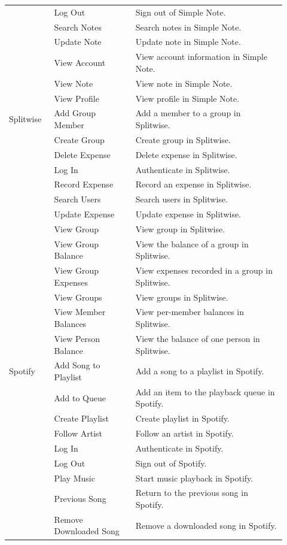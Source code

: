 \begin{longtable}{@{}p{0.15\linewidth}p{0.27\linewidth}p{0.50\linewidth}@{}}
 & Log Out & Sign out of Simple Note. \\
 & Search Notes & Search notes in Simple Note. \\
 & Update Note & Update note in Simple Note. \\
 & View Account & View account information in Simple Note. \\
 & View Note & View note in Simple Note. \\
 & View Profile & View profile in Simple Note. \\
\midrule
Splitwise & Add Group Member & Add a member to a group in Splitwise. \\
 & Create Group & Create group in Splitwise. \\
 & Delete Expense & Delete expense in Splitwise. \\
 & Log In & Authenticate in Splitwise. \\
 & Record Expense & Record an expense in Splitwise. \\
 & Search Users & Search users in Splitwise. \\
 & Update Expense & Update expense in Splitwise. \\
 & View Group & View group in Splitwise. \\
 & View Group Balance & View the balance of a group in Splitwise. \\
 & View Group Expenses & View expenses recorded in a group in Splitwise. \\
 & View Groups & View groups in Splitwise. \\
 & View Member Balances & View per-member balances in Splitwise. \\
 & View Person Balance & View the balance of one person in Splitwise. \\
\midrule
Spotify & Add Song to Playlist & Add a song to a playlist in Spotify. \\
 & Add to Queue & Add an item to the playback queue in Spotify. \\
 & Create Playlist & Create playlist in Spotify. \\
 & Follow Artist & Follow an artist in Spotify. \\
 & Log In & Authenticate in Spotify. \\
 & Log Out & Sign out of Spotify. \\
 & Play Music & Start music playback in Spotify. \\
 & Previous Song & Return to the previous song in Spotify. \\
 & Remove Downloaded Song & Remove a downloaded song in Spotify. \\

\end{longtable}
